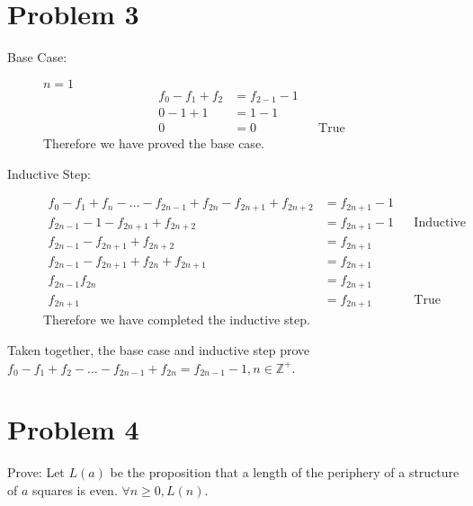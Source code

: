 \documentclass[11pt]{article}
\begin{document}
\section*{Problem 3}
	\begin{description}
	\item[Base Case:] $n=1$
	\begin{align*}
	f_0 -f_1 + f_2 &= f_{2-1} -1 \\
	0 -1 + 1 & = 1-1 \\
	0 &= 0 && \text{True}
	\end{align*}		
	Therefore we have proved the base case.
	
	\item[Inductive Step:]
	
	\begin{align*}
	f_0-f_1+f_n-\ldots-f_{2n-1} + f_{2n} -f_{2n+1}+f_{2n+2} &= f_{2n+1} -1 \\
	f_{2n-1} -1 -f_{2n+1}+f_{2n+2} &= f_{2n+1} -1 && \text{Inductive Hypothesis}\\
	f_{2n-1}-f_{2n+1}+f_{2n+2} &= f_{2n+1}\\
	f_{2n-1}-f_{2n+1}+f_{2n}+f_{2n+1} &= f_{2n+1}\\
	f_{2n-1}f_{2n} &= f_{2n+1}\\
	f_{2n+1} &= f_{2n+1} && \text{True}
	\end{align*}
	Therefore we have completed the inductive step.
	\end{description}
	
	Taken together, the base case and inductive step prove $f_0-f_1+f_2-\ldots-f_{2n-1} + f_{2n} = f_{2n-1} -1, n\in\mathbb{Z}^+$.
	
	



\section*{Problem 4}
Prove: Let $L(a)$ be the proposition that a length of the periphery of a structure of $a$ squares is even. $\forall n \ge 0, L(n)$.
\end{document}
